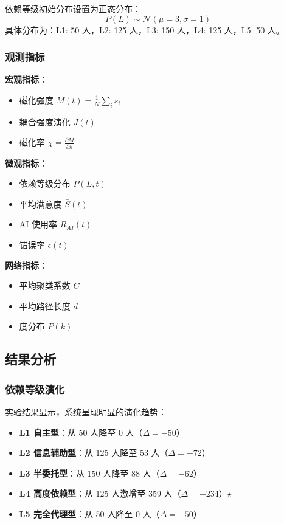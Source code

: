 \documentclass[a4paper,12pt]{article}
\begin{document}
依赖等级初始分布设置为正态分布：
\begin{equation}
    P(L) \sim \mathcal{N}(\mu=3, \sigma=1)
\end{equation}
具体分布为：L1: 50 人，L2: 125 人，L3: 150 人，L4: 125 人，L5: 50 人。

\subsubsection{观测指标}

\textbf{宏观指标}：
\begin{itemize}
    \item 磁化强度 $M(t) = \frac{1}{N}\sum_i s_i$
    \item 耦合强度演化 $J(t)$
    \item 磁化率 $\chi = \frac{\partial M}{\partial h}$
\end{itemize}

\textbf{微观指标}：
\begin{itemize}
    \item 依赖等级分布 $P(L,t)$
    \item 平均满意度 $\bar{S}(t)$
    \item AI 使用率 $R_{AI}(t)$
    \item 错误率 $\epsilon(t)$
\end{itemize}

\textbf{网络指标}：
\begin{itemize}
    \item 平均聚类系数 $C$
    \item 平均路径长度 $d$
    \item 度分布 $P(k)$
\end{itemize}

\subsection{结果分析}

\subsubsection{依赖等级演化}

实验结果显示，系统呈现明显的演化趋势：
\begin{itemize}
    \item \textbf{L1 自主型}：从 50 人降至 0 人（$\Delta = -50$）
    \item \textbf{L2 信息辅助型}：从 125 人降至 53 人（$\Delta = -72$）
    \item \textbf{L3 半委托型}：从 150 人降至 88 人（$\Delta = -62$）
    \item \textbf{L4 高度依赖型}：从 125 人激增至 359 人（$\Delta = +234$）$\star$
    \item \textbf{L5 完全代理型}：从 50 人降至 0 人（$\Delta = -50$）
\end{itemize}
\end{document}
